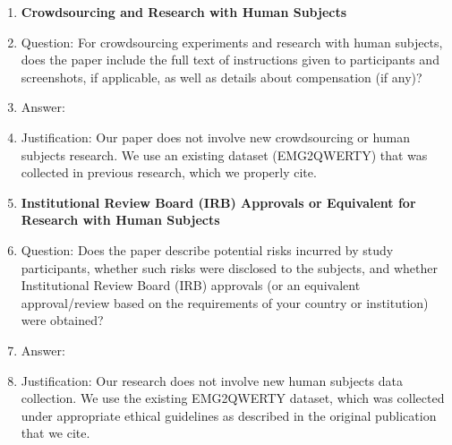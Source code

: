 \begin{enumerate}
\item {\bf Crowdsourcing and Research with Human Subjects}
    \item[] Question: For crowdsourcing experiments and research with human subjects, does the paper include the full text of instructions given to participants and screenshots, if applicable, as well as details about compensation (if any)? 
    \item[] Answer: \answerNA{}
    \item[] Justification: Our paper does not involve new crowdsourcing or human subjects research. We use an existing dataset (EMG2QWERTY) that was collected in previous research, which we properly cite.

\item {\bf Institutional Review Board (IRB) Approvals or Equivalent for Research with Human Subjects}
    \item[] Question: Does the paper describe potential risks incurred by study participants, whether such risks were disclosed to the subjects, and whether Institutional Review Board (IRB) approvals (or an equivalent approval/review based on the requirements of your country or institution) were obtained?
    \item[] Answer: \answerNA{}
    \item[] Justification: Our research does not involve new human subjects data collection. We use the existing EMG2QWERTY dataset, which was collected under appropriate ethical guidelines as described in the original publication that we cite.

\end{enumerate} 